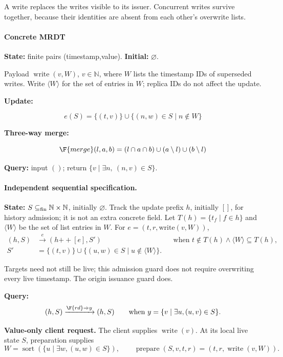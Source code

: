 A write replaces the writes visible to its issuer. Concurrent writes survive together, because their identities are absent from each other's overwrite lists.

\paragraph{Concrete MRDT}
\textbf{State:} finite pairs (timestamp,value). \textbf{Initial:} $\varnothing$.

Payload $\operatorname{write}(v,W)$, $v\in\mathbb{N}$, where $W$ lists the timestamp IDs of superseded writes. Write $\langle W\rangle$ for the set of entries in $W$; replica IDs do not affect the update.

\textbf{Update:}

\[
e(S)=\{(t,v)\}\cup\{(n,w)\in S\mid n\notin W\}
\]


\textbf{Three-way merge:}

\[
\F{merge}(l,a,b)=(l\cap a\cap b)\cup(a\setminus l)\cup(b\setminus l)
\]


\textbf{Query:} input $()$; return $\{v\mid\exists n,\ (n,v)\in S\}$.

\paragraph{Independent sequential specification.}
\textbf{State:} $S\subseteq_{\rm fin}\mathbb N\times\mathbb N$, initially $\varnothing$. Track the update prefix $h$, initially $[]$, for history admission; it is not an extra concrete field. Let $T(h)=\{t_f\mid f\in h\}$ and $\langle W\rangle$ be the set of list entries in $W$. For $e=(t,r,\mathrm{write}(v,W))$,
\[
\begin{aligned}(h,S)&\xrightarrow{e}(h\mathbin{+\!+}[e],S')&&\text{when }t\notin T(h)\land\langle W\rangle\subseteq T(h),\\S'&=\{(t,v)\}\cup\{(u,w)\in S\mid u\notin\langle W\rangle\}.\end{aligned}
\]

Targets need not still be live; this admission guard does not require overwriting every live timestamp. The origin issuance guard does.

\textbf{Query:}
\[
(h,S)\xrightarrow{\F{rd}\Rightarrow y}(h,S)\qquad\text{when }y=\{v\mid\exists u,(u,v)\in S\}.
\]


\textbf{Value-only client request.} The client supplies $\operatorname{write}(v)$. At its local live state $S$, preparation supplies
\[
W=\operatorname{sort}(\{u\mid\exists w,(u,w)\in S\}),\qquad\operatorname{prepare}(S,v,t,r)=(t,r,\operatorname{write}(v,W)).
\]

